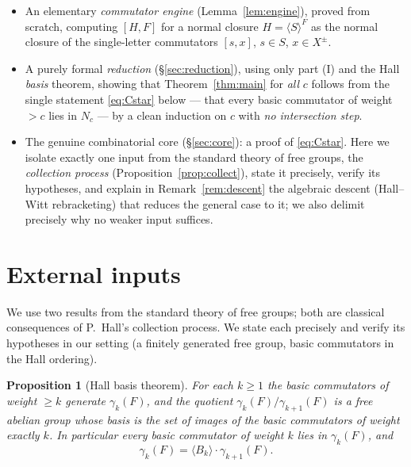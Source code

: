 \documentclass{amsart}
\newtheorem{proposition}{Proposition}
\theoremstyle{definition}
\theoremstyle{remark}
\begin{document}
\begin{itemize}
\item[(I)] An elementary \emph{commutator engine}
(Lemma~\ref{lem:engine}), proved from scratch, computing $[H,F]$ for a normal
closure $H=\langle S\rangle^F$ as the normal closure of the single-letter
commutators $[s,x]$, $s\in S$, $x\in X^{\pm}$.

\item[(II)] A purely formal \emph{reduction} (\S\ref{sec:reduction}), using only
part (I) and the Hall \emph{basis} theorem, showing that
Theorem~\ref{thm:main} for \emph{all} $c$ follows from the single statement
\eqref{eq:Cstar} below --- that every basic commutator of weight $>c$ lies in
$N_c$ --- by a clean induction on $c$ with \emph{no intersection step}.

\item[(III)] The genuine combinatorial core (\S\ref{sec:core}): a proof of
\eqref{eq:Cstar}. Here we isolate exactly one input from the standard theory of
free groups, the \emph{collection process} (Proposition~\ref{prop:collect}),
state it precisely, verify its hypotheses, and explain in
Remark~\ref{rem:descent} the algebraic descent (Hall--Witt rebracketing) that
reduces the general case to it; we also delimit precisely why no weaker input
suffices.
\end{itemize}

\section{External inputs}\label{sec:input}

We use two results from the standard theory of free groups; both are classical
consequences of P.~Hall's collection process. We state each precisely and verify
its hypotheses in our setting (a finitely generated free group, basic commutators
in the Hall ordering).

\begin{proposition}[Hall basis theorem]\label{prop:hall}
For each $k\ge 1$ the basic commutators of weight $\ge k$ generate $\gamma_k(F)$,
and the quotient $\gamma_k(F)/\gamma_{k+1}(F)$ is a free abelian group whose basis
is the set of images of the basic commutators of weight exactly $k$. In
particular every basic commutator of weight $k$ lies in $\gamma_k(F)$, and
\begin{equation}\label{eq:hall-decomp}
\gamma_k(F)=\langle B_k\rangle\cdot\gamma_{k+1}(F).
\end{equation}
\end{proposition}
\end{document}
